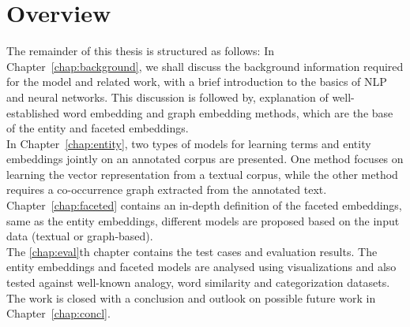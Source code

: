 \section{Overview}
The remainder of this thesis is structured as follows: 
In Chapter~\ref{chap:background},  we shall discuss the background information required for the model and related work, with a brief introduction to the basics of NLP and neural networks. This discussion is followed by, explanation of well-established word embedding and graph embedding methods, which are the base of the entity and faceted embeddings.\\
 In Chapter~\ref{chap:entity}, two types of models for learning terms and entity embeddings jointly on an annotated corpus are presented. One method focuses on learning the vector representation from a textual corpus, while the other method requires a co-occurrence graph extracted from the annotated text.\\
Chapter~\ref{chap:faceted} contains an in-depth definition of the faceted embeddings, same as the entity embeddings, different models are proposed based on the input data (textual or graph-based). \\
The \ref{chap:eval}th chapter contains the test cases and evaluation results. The entity embeddings and faceted models are analysed using visualizations and also tested against well-known analogy, word similarity and categorization datasets. \\
The work is closed with a conclusion and outlook on possible future work in Chapter~\ref{chap:concl}. 


